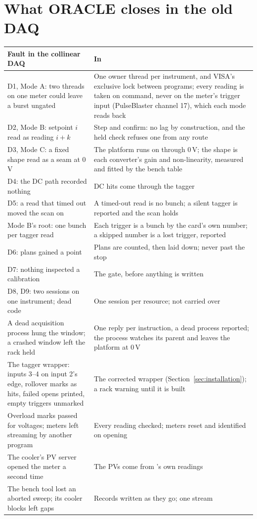 \section{What ORACLE closes in the old DAQ}
\label{sec:design}

\begin{center}
\small
\begin{tabularx}{\textwidth}{@{}>{\raggedright\arraybackslash}p{}L@{}}
\toprule
Fault in the collinear DAQ & In \oracle{} \\
\midrule
D1, Mode A: two threads on one meter could leave a burst ungated & One owner thread per
    instrument, and VISA's exclusive lock between programs; every reading is taken on
    command, never on the meter's trigger input (PulseBlaster channel 17), which each mode
    reads back \\
D2, Mode B: setpoint $i$ read as reading $i + k$ & Step and confirm: no lag by construction,
    and the held check refuses one from any route \\
D3, Mode C: a fixed shape read as a seam at 0\,V & The platform runs on through 0\,V; the
    shape is each converter's gain and non-linearity, measured and fitted by the bench table \\
D4: the DC path recorded nothing & DC hits come through the tagger \\
D5: a read that timed out moved the scan on & A timed-out read is no bunch; a silent tagger
    is reported and the scan holds \\
Mode B's root: one bunch per tagger read & Each trigger is a bunch by the card's own number;
    a skipped number is a lost trigger, reported \\
D6: plans gained a point & Plans are counted, then laid down; never past the stop \\
D7: nothing inspected a calibration & The gate, before anything is written \\
D8, D9: two sessions on one instrument; dead code & One session per resource; not carried
    over \\
A dead acquisition process hung the window; a crashed window left the rack held & One reply
    per instruction, a dead process reported; the process watches its parent and leaves the
    platform at 0\,V \\
The tagger wrapper: inputs 3--4 on input 2's edge, rollover marks as hits, failed opens
    printed, empty triggers unmarked & The corrected wrapper (Section~\ref{sec:installation});
    a rack warning until it is built \\
Overload marks passed for voltages; meters left streaming by another program & Every
    reading checked; meters reset and identified on opening \\
The cooler's PV server opened the meter a second time & The PVs come from \oracle{}'s own
    readings \\
The bench tool lost an aborted sweep; its cooler blocks left gaps & Records written as they
    go; one stream \\
\bottomrule
\end{tabularx}
\end{center}
